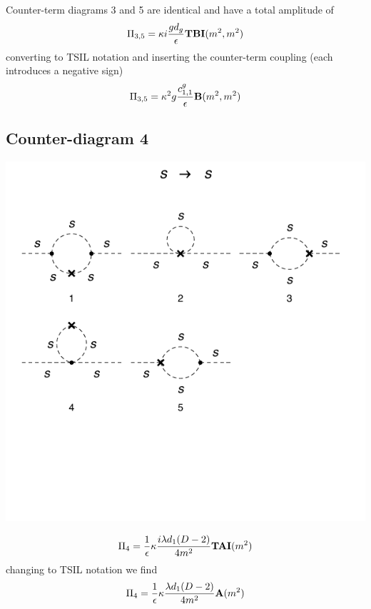 \documentclass[11pt]{article}
\newcommand{\tsil}{\textsf{TSIL} }
\begin{document}
\noindent\begin{minipage}{0.7\textwidth}
Counter-term diagrams 3 and 5 are identical and have a total amplitude of
 \begin{align}
 \Pi_{3,5} = \kappa i \frac{g d_g}{\epsilon} {\tt{\mathbf{TBI}}}(m^2,m^2) 
 \end{align}
converting to \tsil notation and inserting the counter-term coupling (each introduces a negative sign)
\begin{align}
 \Pi_{3,5} = \kappa^2 g \frac{c_{1,1}^g}{\epsilon} {\tt{\mathbf{B}}}(m^2,m^2) 
 \end{align}
\end{minipage}
 
\subsection*{Counter-diagram 4}
\noindent\begin{minipage}{0.3\textwidth}
\begin{center}
\includegraphics{2loop_4c.pdf}
\end{center}
\end{minipage}
\noindent\begin{minipage}{0.7\textwidth}

 \begin{align}
 \Pi_4 =  \frac{ 1 }{\epsilon}\kappa \frac{i \lambda d_1 (D-2)}{ 4 m^2} {\tt{\mathbf{TAI}}}(m^2) 
 \end{align}
changing to \tsil notation we find
 \begin{align}
 \Pi_4 =  \frac{ 1 }{\epsilon}\kappa \frac{ \lambda d_1 (D-2)}{ 4 m^2} {\tt{\mathbf{A}}}(m^2) 
 \end{align}
 \end{minipage}
\end{document}
